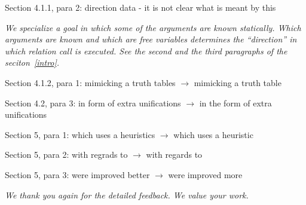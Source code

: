 Section 4.1.1, para 2: direction data - it is not clear what is meant by this

\emph{We specialize a \mk goal in which some of the arguments are known statically. Which arguments are known and which are free variables determines the ``direction'' in which relation call is executed. See the second and the third paragraphs of the seciton~\ref{intro}. }

Section 4.1.2, para 1: mimicking a truth tables $\to$ mimicking a truth table

Section 4.2, para 3: in form of extra unifications $\to$ in the form of extra unifications

Section 5, para 1: which uses a heuristics $\to$ which uses a heuristic

Section 5, para 2: with regrads to $\to$ with regards to

Section 5, para 3: were improved better $\to$ were improved more

\emph{We thank you again for the detailed feedback. We value your work.}